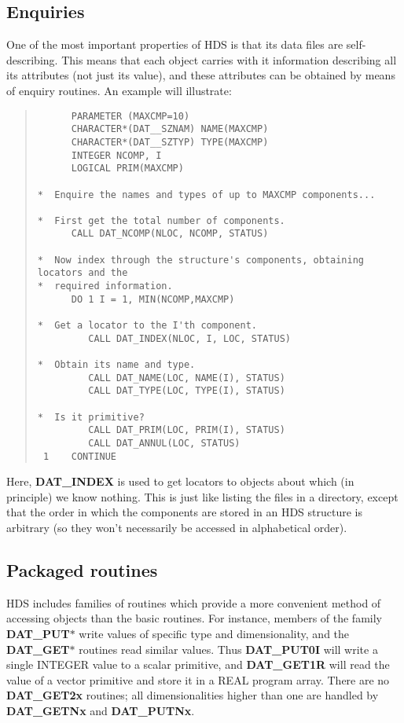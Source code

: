 \subsection{Enquiries}

One of the most important properties of HDS is that its data files are
self-describing.
This means that each object carries with it information describing all its
attributes (not just its value), and these attributes can be obtained by means
of enquiry routines.
An example will illustrate:

\begin{quote}

\begin{small}
\begin{verbatim}
      PARAMETER (MAXCMP=10)
      CHARACTER*(DAT__SZNAM) NAME(MAXCMP)
      CHARACTER*(DAT__SZTYP) TYPE(MAXCMP)
      INTEGER NCOMP, I
      LOGICAL PRIM(MAXCMP)

*  Enquire the names and types of up to MAXCMP components...

*  First get the total number of components.
      CALL DAT_NCOMP(NLOC, NCOMP, STATUS)

*  Now index through the structure's components, obtaining locators and the
*  required information.
      DO 1 I = 1, MIN(NCOMP,MAXCMP)

*  Get a locator to the I'th component.
         CALL DAT_INDEX(NLOC, I, LOC, STATUS)

*  Obtain its name and type.
         CALL DAT_NAME(LOC, NAME(I), STATUS)
         CALL DAT_TYPE(LOC, TYPE(I), STATUS)

*  Is it primitive?
         CALL DAT_PRIM(LOC, PRIM(I), STATUS)
         CALL DAT_ANNUL(LOC, STATUS)
 1    CONTINUE
\end{verbatim}
\end{small}

\end{quote}
Here, {\bf DAT\_INDEX} is used to get locators to objects about which (in
principle) we know nothing.
This is just like listing the files in a directory, except that the order in
which the components are stored in an HDS structure is arbitrary (so they
won't necessarily be accessed in alphabetical order).

\subsection{Packaged routines}
\label{S_package}

HDS includes families of routines which provide a more convenient method of
accessing objects than the basic routines.
For instance, members of the family {\bf DAT\_PUT$*$} write values of specific
type and dimensionality, and the {\bf DAT\_GET$*$} routines read similar values.
Thus {\bf DAT\_PUT0I} will write a single INTEGER value to a scalar primitive,
and {\bf DAT\_GET1R} will read the value of a vector primitive and store it in a
REAL program array.
There are no {\bf DAT\_GET2x} routines; all dimensionalities higher than one
are handled by {\bf DAT\_GETNx} and {\bf DAT\_PUTNx}.

